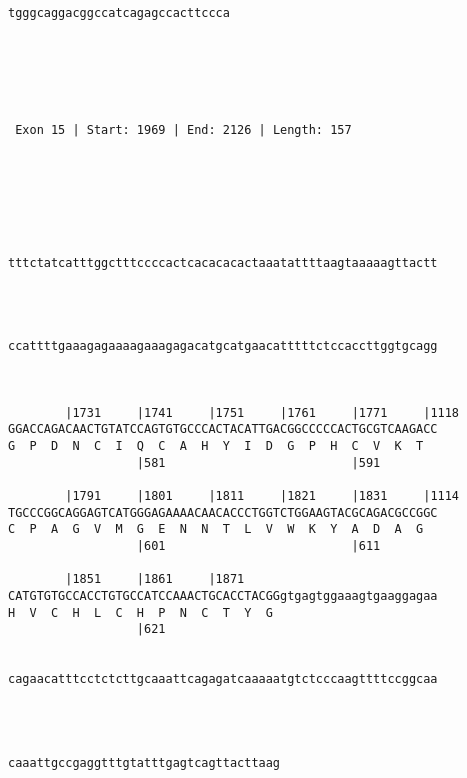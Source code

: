 \documentclass{article}
\begin{document}
\begin{Verbatim}
                                                            
   
                               
tgggcaggacggccatcagagccacttccca
                               
                               
  



 Exon 15 | Start: 1969 | End: 2126 | Length: 157 





   
                                                            
tttctatcatttggctttccccactcacacacactaaatattttaagtaaaaagttactt
                                                            
                                                            
   
                                                            
ccattttgaaagagaaaagaaagagacatgcatgaacatttttctccaccttggtgcagg
                                                            
                                                            
   
        |1731     |1741     |1751     |1761     |1771     |1118
GGACCAGACAACTGTATCCAGTGTGCCCACTACATTGACGGCCCCCACTGCGTCAAGACC
G  P  D  N  C  I  Q  C  A  H  Y  I  D  G  P  H  C  V  K  T  
                  |581                          |591        
   
        |1791     |1801     |1811     |1821     |1831     |1114
TGCCCGGCAGGAGTCATGGGAGAAAACAACACCCTGGTCTGGAAGTACGCAGACGCCGGC
C  P  A  G  V  M  G  E  N  N  T  L  V  W  K  Y  A  D  A  G  
                  |601                          |611        
   
        |1851     |1861     |1871                           
CATGTGTGCCACCTGTGCCATCCAAACTGCACCTACGGgtgagtggaaagtgaaggagaa
H  V  C  H  L  C  H  P  N  C  T  Y  G                       
                  |621                                      
   
                                                            
cagaacatttcctctcttgcaaattcagagatcaaaaatgtctcccaagttttccggcaa
                                                            
                                                            
   
                                      
caaattgccgaggtttgtatttgagtcagttacttaag
                                      
                                      
  




\end{Verbatim}
\end{document}
